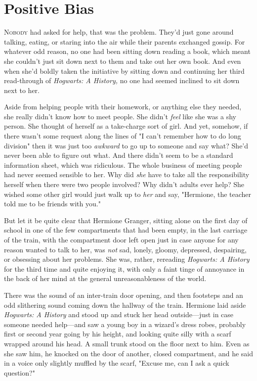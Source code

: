 \chapter{Positive Bias}

\lettrine{N}{obody} had asked for help, that was the problem. They'd just gone around
talking, eating, or staring into the air while their parents exchanged gossip.
For whatever odd reason, no one had been sitting down reading a book, which
meant she couldn't just sit down next to them and take out her own book. And
even when she'd boldly taken the initiative by sitting down and continuing her
third read-through of \emph{Hogwarts: A History,} no one had seemed inclined to
sit down next to her.

Aside from helping people with their homework, or anything else they needed,
she really didn't know how to meet people. She didn't \emph{feel} like she was
a shy person. She thought of herself as a take-charge sort of girl. And yet,
somehow, if there wasn't some request along the lines of "I can't remember how
to do long division" then it was just too \emph{awkward} to go up to someone
and say{\el} what? She'd never been able to figure out what. And there
didn't seem to be a standard information sheet, which was ridiculous. The whole
business of meeting people had never seemed sensible to her. Why did \emph{she}
have to take all the responsibility herself when there were two people
involved? Why didn't adults ever help? She wished some other girl would just
walk up to \emph{her} and say, "Hermione, the teacher told me to be friends
with you."

But let it be quite clear that Hermione Granger, sitting alone on the first day
of school in one of the few compartments that had been empty, in the last
carriage of the train, with the compartment door left open just in case anyone
for any reason wanted to talk to her, was \emph{not} sad, lonely, gloomy,
depressed, despairing, or obsessing about her problems. She was, rather,
rereading \emph{Hogwarts: A History} for the third time and quite enjoying it,
with only a faint tinge of annoyance in the back of her mind at the general
unreasonableness of the world.

There was the sound of an inter-train door opening, and then footsteps and an
odd slithering sound coming down the hallway of the train. Hermione laid aside
\emph{Hogwarts: A History} and stood up and stuck her head outside---just in
case someone needed help---and saw a young boy in a wizard's dress robes,
probably first or second year going by his height, and looking quite silly with
a scarf wrapped around his head. A small trunk stood on the floor next to him.
Even as she saw him, he knocked on the door of another, closed compartment, and
he said in a voice only slightly muffled by the scarf, "Excuse me, can I ask a
quick question?"

